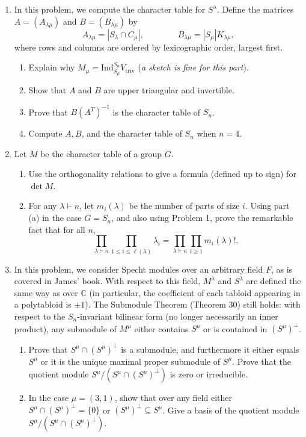 \documentclass[12pt]{article}
\newcommand{\C}{\mathbb{C}}
\renewcommand{\t}[1]{\text{#1}}
\newcommand{\Ind}{\text{Ind}}
\begin{document}
\begin{enumerate}

\item[1.] In this problem, we compute the character table for $S^\lambda$. Define the matrices $A = (A_{\lambda\mu})$ and $B = (B_{\lambda\mu})$ by
\[
A_{\lambda\mu} = |S_\lambda\cap C_\mu|, \qquad\qquad B_{\lambda\mu} = |S_\mu|K_{\lambda\mu},
\]
where rows and columns are ordered by lexicographic order, largest first.

\begin{enumerate}
    \item Explain why $M_\mu = \Ind_{S_\mu}^{S_n} V_{\t{triv}}$ (\emph{a sketch is fine for this part}).
    \item Show that $A$ and $B$ are upper triangular and invertible.
    \item Prove that $B(A^T)^{-1}$ is the character table of $S_n$.
    \item Compute $A,B$, and the character table of $S_n$ when $n=4$.
\end{enumerate}


\item[2.] Let $M$ be the character table of a group $G$.

\begin{enumerate}
\item Use the orthogonality relations to give a formula (defined up to sign) for $\det M$.

\item For any $\lambda\vdash n$, let $m_i(\lambda)$ be the number of parts of size $i$. Using part (a) in the case $G=S_n$, and also using Problem 1, prove the remarkable fact that for all $n$,
\[
\prod_{\lambda\vdash n} \prod_{1\le i\le \ell(\lambda)} \lambda_i = \prod_{\lambda\vdash n} \prod_{i\ge 1} m_i(\lambda)!.
\]
\end{enumerate}


\item[3.] In this problem, we consider Specht modules over an arbitrary field $F$, as is covered in James' book. With respect to this field, $M^\lambda$ and $S^\lambda$ are defined the same way as over $\C$ (in particular, the coefficient of each tabloid appearing in a polytabloid is $\pm 1$). The Submodule Theorem (Theorem 30) still holds: with respect to the $S_n$-invariant bilinear form (no longer necessarily an inner product), any submodule of $M^\mu$ either contains $S^\mu$ or is contained in $(S^\mu)^\perp$.

\begin{enumerate}
    \item Prove that $S^\mu\cap (S^\mu)^\perp$ is a submodule, and furthermore it either equals $S^\mu$ or it is the unique maximal proper submodule of $S^\mu$. Prove that the quotient module $S^\mu/(S^\mu\cap (S^\mu)^\perp)$ is zero or irreducible.
    \item In the case $\mu = (3,1)$, show that over any field either $S^\mu\cap (S^\mu)^\perp = \{0\}$ or $(S^\mu)^\perp\subseteq S^\mu$. Give a basis of the quotient module $S^\mu/(S^\mu\cap (S^\mu)^\perp)$.
\end{enumerate}


\end{enumerate}
\end{document}
